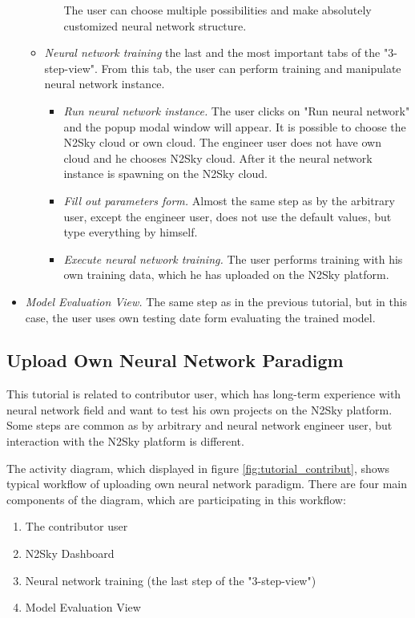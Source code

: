 \begin{itemize}
\begin{itemize}
\begin{itemize}
The user can choose multiple possibilities and make absolutely customized neural network structure.

\end{itemize}
\item \emph{Neural network training} the last and the most important tabs of the "3-step-view". From this tab, the user can perform training and manipulate neural network instance.
\begin{itemize}
\item \emph{Run neural network instance.} The user clicks on "Run neural network" and the popup modal window will appear. It is possible to choose the N2Sky cloud or own cloud. The engineer user does not have own cloud and he chooses N2Sky cloud. After it the neural network instance is spawning on the N2Sky cloud.
\item \emph{Fill out parameters form.} Almost the same step as by the arbitrary user, except the engineer user, does not use the default values, but type everything by himself.
\item \emph{Execute neural network training.} The user performs training with his own training data, which he has uploaded on the N2Sky platform.
\end{itemize}
\end{itemize}
 \item \emph{Model Evaluation View.} The same step as in the previous tutorial, but in this case, the user uses own testing date form evaluating the trained model.
\end{itemize}



\subsection{Upload Own Neural Network Paradigm}\label{Upload own neural network paradigm}

This tutorial is related to contributor user, which has long-term experience with neural network field and want to test his own projects on the N2Sky platform.
Some steps are common as by arbitrary and neural network engineer user, but interaction with the N2Sky platform is different.


The activity diagram, which displayed in figure \ref{fig:tutorial_contribut}, shows typical workflow of uploading own neural network paradigm. There are four main components of the diagram, which are participating in this workflow: 
\begin{enumerate}
\item The contributor user
\item N2Sky Dashboard
\item Neural network training (the last step of the "3-step-view")
\item Model Evaluation View
\end{enumerate}

